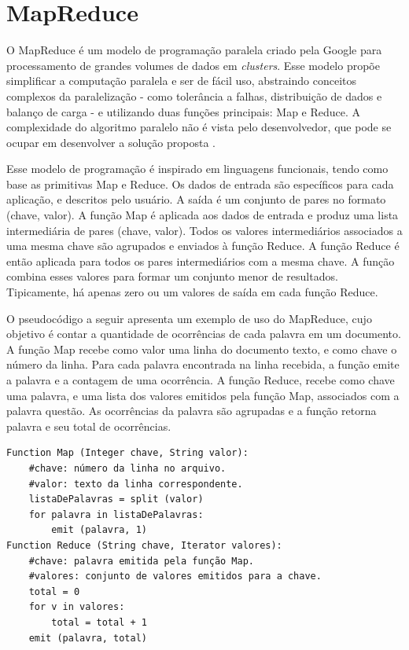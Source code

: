 \section{MapReduce}
O MapReduce é um modelo de programação paralela criado pela Google para processamento de grandes volumes de dados em \textit{clusters}. Esse modelo propõe simplificar a computação paralela e ser de fácil uso, abstraindo conceitos complexos da paralelização - como tolerância a falhas, distribuição de dados e balanço de carga - e utilizando duas funções principais: Map e Reduce. A complexidade do algoritmo paralelo não é vista pelo desenvolvedor, que pode se ocupar em desenvolver a solução proposta \cite{Dean:2008}.

Esse modelo de programação é inspirado em linguagens funcionais, tendo como base as primitivas Map e Reduce.
Os dados de entrada são específicos para cada aplicação, e descritos pelo usuário. A saída é um conjunto de pares no formato (chave, valor).
A função Map é aplicada aos dados de entrada e produz uma lista intermediária de pares (chave, valor). Todos os valores intermediários associados a uma mesma chave são agrupados e enviados à função Reduce.
A função Reduce é então aplicada para todos os pares intermediários com a mesma chave. A função combina esses valores para formar um conjunto menor de resultados.
Tipicamente, há apenas zero ou um valores de saída em cada função Reduce.

O pseudocódigo a seguir apresenta um exemplo de uso do MapReduce, cujo objetivo é contar a quantidade de ocorrências de cada palavra em um documento. A função Map recebe como valor uma linha do documento texto, e como chave o número da linha. Para cada palavra encontrada na linha recebida, a função emite a palavra e a contagem de uma ocorrência. A função Reduce, recebe como chave uma palavra, e uma lista dos valores emitidos pela função Map, associados com a palavra questão. As ocorrências da palavra são agrupadas e a função retorna palavra e seu total de ocorrências.

\begin{lstlisting}[label=some-code,caption=some-code]
Function Map (Integer chave, String valor):
	#chave: número da linha no arquivo.
	#valor: texto da linha correspondente.
	listaDePalavras = split (valor)
	for palavra in listaDePalavras:
		emit (palavra, 1)
Function Reduce (String chave, Iterator valores):
	#chave: palavra emitida pela função Map.
	#valores: conjunto de valores emitidos para a chave.
	total = 0
	for v in valores:
		total = total + 1
	emit (palavra, total)
\end{lstlisting}

